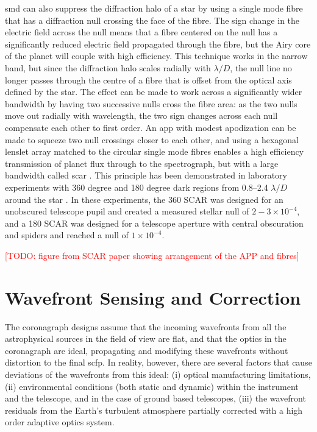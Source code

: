 \documentclass[letterpaper]{ar-1col}
\newcommand{\ld}{$\lambda/D$}
\newcommand{\todo}[1]{\textcolor{red}{[TODO: #1]}}
\begin{document}
\ac{smd} can also suppress the diffraction halo of a star by using a single mode fibre that has a diffraction null crossing the face of the fibre.
%
The sign change in the electric field across the null means that a fibre centered on the null has a significantly reduced electric field propagated through the fibre, but the Airy core of the planet will couple with high efficiency.
%
This technique works in the narrow band, but since the diffraction halo scales radially with \ld{}, the null line no longer passes through the centre of a fibre that is offset from the optical axis defined by the star.
%
The effect can be made to work across a significantly wider bandwidth by having two successive nulls cross the fibre area: as the two nulls move out radially with wavelength, the two sign changes across each null compensate each other to first order.
%
An \ac{app} with modest apodization can be made to squeeze two null crossings closer to each other, and using a hexagonal lenslet array matched to the circular single mode fibres enables a high efficiency transmission of planet flux through to the spectrograph, but with a large bandwidth called \acl{scar} \citep[\acs{scar}; ][]{Por20a,Haffert20}.
%
This principle has been demonstrated in laboratory experiments with 360 degree and 180 degree  dark regions from 0.8–2.4 \ld{} around the star \citep{Haffert20}.
%
In these experiments, the 360 SCAR was designed for an unobscured telescope pupil and created a measured stellar null of $2-3 \times 10^{-4}$, and a 180 SCAR was designed for a telescope aperture with central obscuration and spiders and reached a null of $1\times 10^{-4}$. 

\todo{figure from SCAR paper showing arrangement of the APP and fibres}

\section{Wavefront Sensing and Correction}

The coronagraph designs assume that the incoming wavefronts from all the astrophysical sources in the field of view are flat, and that the optics in the coronagraph are ideal, propagating and modifying these wavefronts without distortion to the final \ac{scfp}.
%
In reality, however, there are several factors that cause deviations of the wavefronts from this ideal: (i) optical manufacturing limitations, (ii) environmental conditions (both static and dynamic) within the instrument and the telescope, and in the case of ground based telescopes, (iii) the wavefront residuals from the Earth's turbulent atmosphere partially corrected with a high order adaptive optics system.
\end{document}
